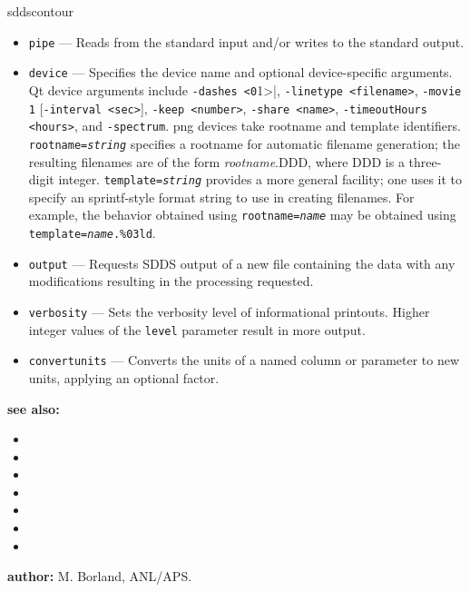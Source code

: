 \begin{sddsprog}{sddscontour}
\begin{itemize}
\begin{itemize}
        \item \verb|pipe| --- Reads from the standard input and/or writes to the standard output.
        \item \verb|device| --- Specifies the device name and optional device-specific arguments. Qt device
        arguments include \verb|-dashes <0|1>|, \verb|-linetype <filename>|, \verb|-movie 1| [\verb|-interval <sec>|],
        \verb|-keep <number>|, \verb|-share <name>|, \verb|-timeoutHours <hours>|, and \verb|-spectrum|. png devices
        take rootname and template identifiers. {\tt rootname={\em string}} specifies a rootname
        for automatic filename generation; the resulting filenames are of the form {\em rootname}.DDD, where DDD
        is a three-digit integer. {\tt template={\em string}} provides a more general facility; one uses it to
        specify an sprintf-style format string to use in creating filenames. For example, the behavior obtained
        using {\tt rootname={\em name}} may be obtained  using {\tt template={\em name}.\%03ld}.
        \item \verb|output| --- Requests SDDS output of a new file containing the data with any modifications
                resulting in the processing requested.
        \item \verb|verbosity| --- Sets the verbosity level of informational printouts. Higher integer values
                of the \verb|level| parameter result in more output.
        \item \verb|convertunits| --- Converts the units of a named column or parameter to new units, applying an optional factor.
        \end{itemize}
    \end{itemize}
  \item \textbf{see also:}
    \begin{itemize}
      \item {}
      \item {}
      \item {}
      \item {}
      \item {}
      \item {}
      \item {}
    \end{itemize}
  \item \textbf{author:} M. Borland, ANL/APS.
\end{sddsprog}
